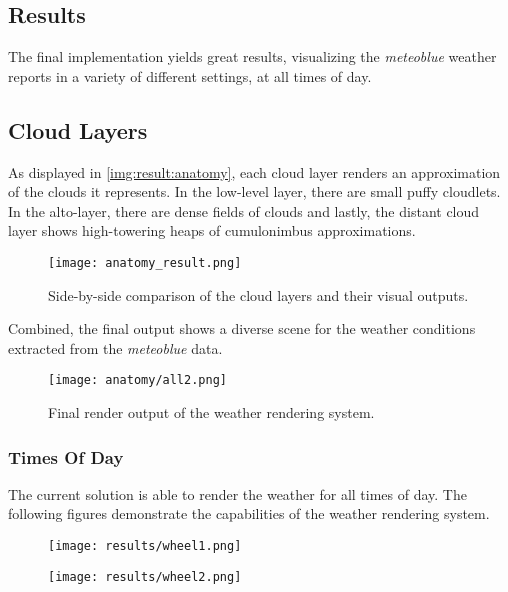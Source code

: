 \clearpage

\subsection{Results}
\label{section:techimpl:results}
The final implementation yields great results, visualizing the \emph{meteoblue} weather reports in a variety of different settings, at all times of day.

\subsection{Cloud Layers}
As displayed in \autoref{img:result:anatomy}, each cloud layer renders an approximation of the clouds it represents.
In the low-level layer, there are small puffy \gls{cloudlet}s. In the alto-layer, there are dense fields of clouds and lastly, the distant cloud layer shows high-towering heaps of cumulonimbus approximations.

\begin{figure}[H]
    \texttt{[image: anatomy\_result.png]}
    \caption{Side-by-side comparison of the cloud layers and their visual outputs.}
    \label{img:result:anatomy}
\end{figure}

\noindent
Combined, the final output shows a diverse scene for the weather conditions extracted from the \emph{meteoblue} data.

\begin{figure}[H]
    \texttt{[image: anatomy/all2.png]}
    \caption{Final render output of the weather rendering system.}
    \label{img:result:final1}
\end{figure}

\clearpage

\subsubsection{Times Of Day}
The current solution is able to render the weather for all times of day. The following figures demonstrate the capabilities of the weather rendering system.

\begin{figure}[H]
    \centering
        \begin{minipage}{0.47\linewidth}
            \texttt{[image: results/wheel1.png]}
            \label{img:result:1}
        \end{minipage}
    \hfill
        \begin{minipage}{0.47\linewidth}
            \texttt{[image: results/wheel2.png]}
            \label{img:result:2}
        \end{minipage}
\end{figure}


